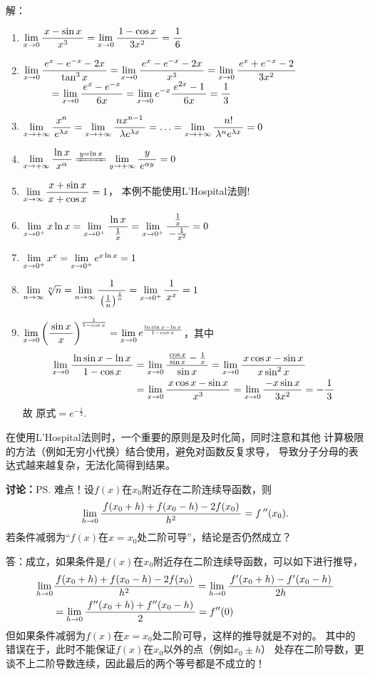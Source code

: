 \ifhint
解：
\begin{enumerate}[(1)]
  \setlength{\itemindent}{1cm}
  \item $\limx{0}\df{x-\sin x}{x^3}
  =\limx0\df{1-\cos x}{3x^2}=\df16$
  \item $\limx{0}\df{e^x-e^{-x}-2x}{\tan^3x}
  =\limx0\df{e^x-e^{-x}-2x}{x^3}
  =\limx0\df{e^x+e^{-x}-2}{3x^2}$\\
  $\hspace*{1cm}=\limx0\df{e^x-e^{-x}}{6x}=\limx0e^{-x}\df{e^{2x}-1}{6x}=\df13$ 
  \item $\limx{+\infty}\df{x^n}{e^{\lambda x}}
  =\limx{+\infty}\df{nx^{n-1}}{\lambda e^{\lambda x}}
  =\ldots=\limx{+\infty}\df{n!}{\lambda^n e^{\lambda x}}=0$ 
  \item $\limx{+\infty}\df{\ln x}{x^\alpha}
  \xlongequal{y=\ln x}\lim\limits_{y\to+\infty}\df{y}
  {e^{\alpha y}}=0$ 
  \item $\limx{\infty}\df{x+\sin x}{x+\cos x}=1$，
  本例不能使用L'Hospital法则!
  \item $\limx{0^+}x\ln x
  =\limx{0^+}\df{\ln x}{\frac1x}
  =\limx{0^+}\df{\frac1x}{-\frac1{x^2}}=0$
  \item $\limx{0^+}x^x=\limx{0^+}e^{x\ln x}=1$
  \item $\limn\sqrt[n]n=\limn\df1{\left(\frac1n\right)^{\frac1n}}
  =\limx{0^+}\df1{x^x}=1$
  \item $\limx0\left(\df{\sin x}x\right)^{\frac1{1-\cos x}}
  =\limx0e^{\frac{\ln\sin x-\ln x}{1-\cos x}}$，其中
  \begin{align*}
  	\limx0\df{\ln\sin x-\ln x}{1-\cos x}
  	&=\limx0\df{\frac{\cos x}{\sin x}-\frac1x}{\sin x}
  	=\limx0\df{x\cos x-\sin x}{x\sin^2 x}\\
  	&=\limx0\df{x\cos x-\sin x}{x^3}
  	=\limx0\df{-x\sin x}{3x^2}=-\df13
  \end{align*}
  故 $\mbox{原式}=e^{-\frac13}$.\fin
\end{enumerate}
\fi

在使用L'Hospital法则时，一个重要的原则是及时化简，同时注意和其他
计算极限的方法（例如无穷小代换）结合使用，避免对函数反复求导，
导致分子分母的表达式越来越复杂，无法化简得到结果。

{\bf 讨论：}\ps{难点！}设$f(x)$在$x_0$附近存在二阶连续导函数，则
$$\lim\limits_{h\to 0}\df{f(x_0+h)+f(x_0-h)-2f(x_0)}{h^2}=f\,''(x_0).$$
若条件减弱为“$f(x)$在$x=x_0$处二阶可导”，结论是否仍然成立？

\ifhint
答：成立，如果条件是$f(x)$在$x_0$附近存在二阶连续导函数，可以如下进行推导，
\begin{align}
	\lim\limits_{h\to 0}&\df{f(x_0+h)+f(x_0-h)-2f(x_0)}{h^2}
	=\lim\limits_{h\to 0}\df{f'(x_0+h)-f'(x_0-h)}{2h}\notag\\
	&=\lim\limits_{h\to 0}\df{f''(x_0+h)+f''(x_0-h)}{2}
	=f''(0)\notag
\end{align}
但如果条件减弱为$f(x)$在$x=x_0$处二阶可导，这样的推导就是不对的。
其中的错误在于，此时不能保证$f(x)$在$x_0$以外的点（例如$x_0\pm h$）
处存在二阶导数，更谈不上二阶导数连续，因此最后的两个等号都是不成立的！

